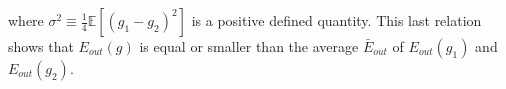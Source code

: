\documentclass[11pt]{article}
\makeatletter
\newcommand{\boxspacing}{\kern\kvtcb@left@rule\kern\kvtcb@boxsep}
\newcommand{\prompt}[4]{
        \ttfamily\llap{{\color{#2}[#3]:\hspace{3pt}#4}}\vspace{-\baselineskip}
    }
\makeatother
\begin{document}
where
\(\sigma^2\equiv\frac{1}{4}\mathbb{E}\left[\left(g_1-g_2\right)^2\right]\)
is a positive defined quantity. This last relation shows that
\(E_{out}(g)\) is equal or smaller than the average \(\bar{E}_{out}\) of
\(E_{out}(g_1)\) and \(E_{out}(g_2)\).

    \begin{tcolorbox}[breakable, size=fbox, boxrule=1pt, pad at break*=1mm,colback=cellbackground, colframe=cellborder]
\prompt{In}{incolor}{ }{\boxspacing}
\begin{Verbatim}[commandchars=\\\{\}]

\end{Verbatim}
\end{tcolorbox}


    
    
    
\end{document}
